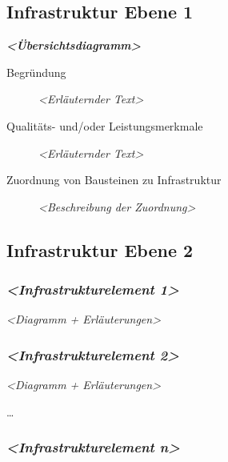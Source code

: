 \documentclass[
]{article}
\begin{document}
\hypertarget{_infrastruktur_ebene_1}{%
\subsection{Infrastruktur Ebene 1}\label{_infrastruktur_ebene_1}}

\emph{\textbf{\textless Übersichtsdiagramm\textgreater{}}}

\begin{description}
\item[Begründung]
\emph{\textless Erläuternder Text\textgreater{}}
\item[Qualitäts- und/oder Leistungsmerkmale]
\emph{\textless Erläuternder Text\textgreater{}}
\item[Zuordnung von Bausteinen zu Infrastruktur]
\emph{\textless Beschreibung der Zuordnung\textgreater{}}
\end{description}

\hypertarget{_infrastruktur_ebene_2}{%
\subsection{Infrastruktur Ebene 2}\label{_infrastruktur_ebene_2}}

\hypertarget{__emphasis_infrastrukturelement_1_emphasis}{%
\subsubsection{\texorpdfstring{\emph{\textless Infrastrukturelement
1\textgreater{}}}{\textless Infrastrukturelement 1\textgreater{}}}\label{__emphasis_infrastrukturelement_1_emphasis}}

\emph{\textless Diagramm + Erläuterungen\textgreater{}}

\hypertarget{__emphasis_infrastrukturelement_2_emphasis}{%
\subsubsection{\texorpdfstring{\emph{\textless Infrastrukturelement
2\textgreater{}}}{\textless Infrastrukturelement 2\textgreater{}}}\label{__emphasis_infrastrukturelement_2_emphasis}}

\emph{\textless Diagramm + Erläuterungen\textgreater{}}

\ldots{}

\hypertarget{__emphasis_infrastrukturelement_n_emphasis}{%
\subsubsection{\texorpdfstring{\emph{\textless Infrastrukturelement
n\textgreater{}}}{\textless Infrastrukturelement n\textgreater{}}}\label{__emphasis_infrastrukturelement_n_emphasis}}
\end{document}
